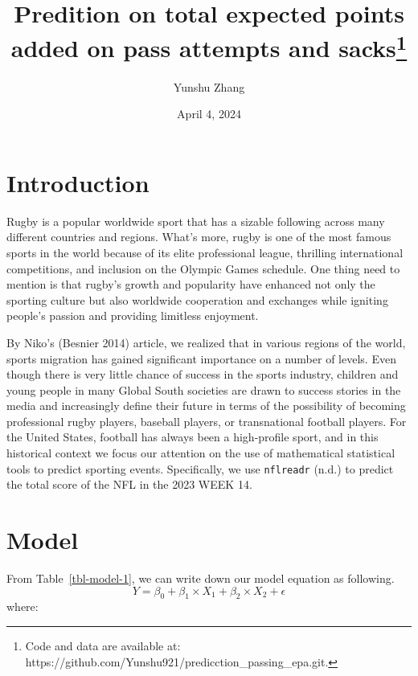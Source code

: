 \documentclass[
  letterpaper,
  DIV=11,
  numbers=noendperiod]{scrartcl}
\title{Predition on total expected points added on pass attempts and
sacks\thanks{Code and data are available at:
https://github.com/Yunshu921/predicction\_passing\_epa.git.}}
\author{Yunshu Zhang}
\date{April 4, 2024}
\renewcommand*\contentsname{Table of contents}
\newcommand\contentsname{Table of contents}
\begin{document}
\maketitle

\renewcommand*\contentsname{Table of contents}
{
\hypersetup{linkcolor=}
\setcounter{tocdepth}{3}
\tableofcontents
}
\section{Introduction}\label{introduction}

Rugby is a popular worldwide sport that has a sizable following across
many different countries and regions. What's more, rugby is one of the
most famous sports in the world because of its elite professional
league, thrilling international competitions, and inclusion on the
Olympic Games schedule. One thing need to mention is that rugby's growth
and popularity have enhanced not only the sporting culture but also
worldwide cooperation and exchanges while igniting people's passion and
providing limitless enjoyment.

By Niko's (Besnier 2014) article, we realized that in various regions of
the world, sports migration has gained significant importance on a
number of levels. Even though there is very little chance of success in
the sports industry, children and young people in many Global South
societies are drawn to success stories in the media and increasingly
define their future in terms of the possibility of becoming professional
rugby players, baseball players, or transnational football players. For
the United States, football has always been a high-profile sport, and in
this historical context we focus our attention on the use of
mathematical statistical tools to predict sporting events. Specifically,
we use \texttt{nflreadr} (n.d.) to predict the total score of the NFL in
the 2023 WEEK 14.

\section{Model}\label{model}

From Table~\ref{tbl-model-1}, we can write down our model equation as
following. \[
Y = β_{0} + β_{1} \times X_{1} + β_{2} \times X_{2} + \epsilon
\] where:
\end{document}
